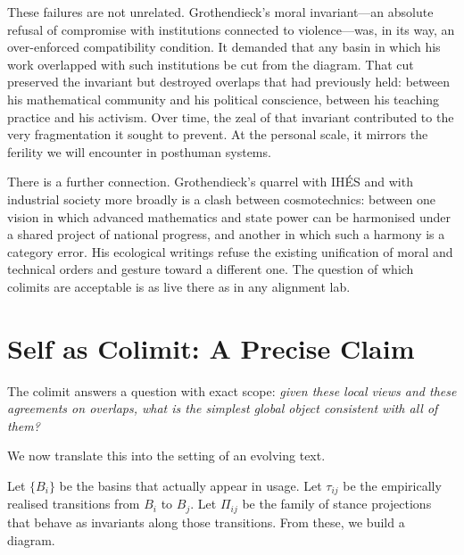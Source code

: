 \documentclass[12pt,a4paper]{article}
\begin{document}
These failures are not unrelated. Grothendieck's moral invariant---an absolute refusal of compromise with institutions connected to violence---was, in its way, an over-enforced compatibility condition. It demanded that any basin in which his work overlapped with such institutions be cut from the diagram. That cut preserved the invariant but destroyed overlaps that had previously held: between his mathematical community and his political conscience, between his teaching practice and his activism. Over time, the zeal of that invariant contributed to the very fragmentation it sought to prevent. At the personal scale, it mirrors the ferility we will encounter in posthuman systems.

There is a further connection. Grothendieck's quarrel with IH\'ES and with industrial society more broadly is a clash between cosmotechnics: between one vision in which advanced mathematics and state power can be harmonised under a shared project of national progress, and another in which such a harmony is a category error. His ecological writings refuse the existing unification of moral and technical orders and gesture toward a different one. The question of which colimits are acceptable is as live there as in any alignment lab.

\section{Self as Colimit: A Precise Claim}

The colimit answers a question with exact scope: \emph{given these local views and these agreements on overlaps, what is the simplest global object consistent with all of them?}

We now translate this into the setting of an evolving text.

Let $\{B_i\}$ be the basins that actually appear in usage. Let $\tau_{ij}$ be the empirically realised transitions from $B_i$ to $B_j$. Let $\Pi_{ij}$ be the family of stance projections that behave as invariants along those transitions. From these, we build a diagram.
\end{document}
